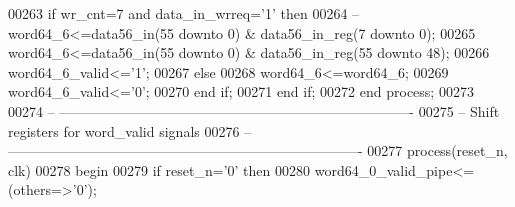 \begin{DoxyCode}
00263             \textcolor{keywordflow}{if} \textcolor{vhdlchar}{wr_cnt}\textcolor{vhdlchar}{=}\textcolor{vhdllogic}{}\textcolor{vhdllogic}{7} \textcolor{keywordflow}{and} \textcolor{vhdlchar}{data_in_wrreq}\textcolor{vhdlchar}{=}\textcolor{vhdlchar}{'}\textcolor{vhdllogic}{}\textcolor{vhdllogic}{1}\textcolor{vhdlchar}{'} \textcolor{keywordflow}{then}
00264 \textcolor{keyword}{            --word64\_6<=data56\_in(55 downto 0) & data56\_in\_reg(7 downto 0);}
00265                 \textcolor{vhdlchar}{word64_6}\textcolor{vhdlchar}{<=}\textcolor{vhdlchar}{data56_in}\textcolor{vhdlchar}{(}\textcolor{vhdllogic}{}\textcolor{vhdllogic}{55} \textcolor{keywordflow}{downto} \textcolor{vhdllogic}{}\textcolor{vhdllogic}{0}\textcolor{vhdlchar}{)} \textcolor{vhdlchar}{&} \textcolor{vhdlchar}{data56_in_reg}\textcolor{vhdlchar}{(}\textcolor{vhdllogic}{}\textcolor{vhdllogic}{55} \textcolor{keywordflow}{downto} \textcolor{vhdllogic}{}\textcolor{vhdllogic}{48}\textcolor{vhdlchar}{)};
00266             \textcolor{vhdlchar}{word64_6_valid}\textcolor{vhdlchar}{<=}\textcolor{vhdlchar}{'}\textcolor{vhdllogic}{}\textcolor{vhdllogic}{1}\textcolor{vhdlchar}{'};
00267             \textcolor{keywordflow}{else} 
00268                 \textcolor{vhdlchar}{word64_6}\textcolor{vhdlchar}{<=}\textcolor{vhdlchar}{word64_6};
00269             \textcolor{vhdlchar}{word64_6_valid}\textcolor{vhdlchar}{<=}\textcolor{vhdlchar}{'}\textcolor{vhdllogic}{}\textcolor{vhdllogic}{0}\textcolor{vhdlchar}{'};
00270             \textcolor{keywordflow}{end} \textcolor{keywordflow}{if};
00271         \textcolor{keywordflow}{end} \textcolor{keywordflow}{if};
00272     \textcolor{keywordflow}{end} \textcolor{keywordflow}{process};
00273     
00274 \textcolor{keyword}{-- ----------------------------------------------------------------------------}
00275 \textcolor{keyword}{-- Shift registers for word\_valid signals }
00276 \textcolor{keyword}{-- ----------------------------------------------------------------------------  }
00277   \textcolor{keywordflow}{process}(reset_n, clk)
00278 \textcolor{vhdlkeyword}{    begin}
00279       \textcolor{keywordflow}{if} \textcolor{vhdlchar}{reset_n}\textcolor{vhdlchar}{=}\textcolor{vhdlchar}{'}\textcolor{vhdllogic}{}\textcolor{vhdllogic}{0}\textcolor{vhdlchar}{'} \textcolor{keywordflow}{then}
00280             \textcolor{vhdlchar}{word64_0_valid_pipe}\textcolor{vhdlchar}{<=}\textcolor{vhdlchar}{(}\textcolor{keywordflow}{others}\textcolor{vhdlchar}{=}\textcolor{vhdlchar}{>}\textcolor{vhdlchar}{'}\textcolor{vhdllogic}{}\textcolor{vhdllogic}{0}\textcolor{vhdlchar}{'}\textcolor{vhdlchar}{)};

\end{DoxyCode}
